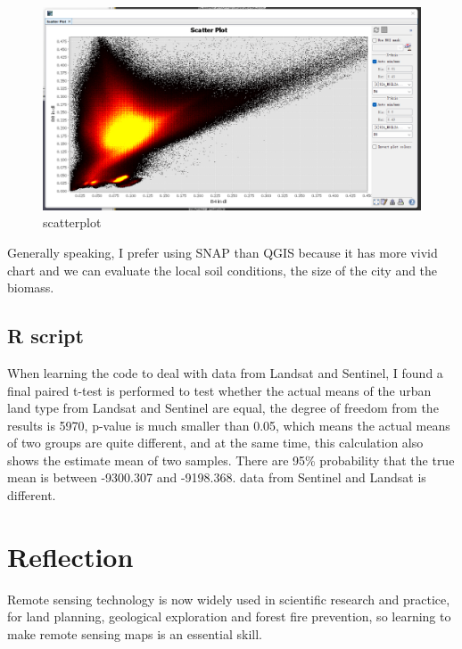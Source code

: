 \documentclass[
  letterpaper,
  DIV=11,
  numbers=noendperiod]{scrreprt}
\begin{document}
\begin{figure}

{\centering \includegraphics[width=6.25in,height=\textheight]{./image/scatterplot2.png}

}

\caption{scatterplot}

\end{figure}

Generally speaking, I prefer using SNAP than QGIS because it has more
vivid chart and we can evaluate the local soil conditions, the size of
the city and the biomass.

\hypertarget{r-script}{%
\subsection{R script}\label{r-script}}

When learning the code to deal with data from Landsat and Sentinel, I
found a final paired t-test is performed to test whether the actual
means of the urban land type from Landsat and Sentinel are equal, the
degree of freedom from the results is 5970, p-value is much smaller than
0.05, which means the actual means of two groups are quite different,
and at the same time, this calculation also shows the estimate mean of
two samples. There are 95\% probability that the true mean is between
-9300.307 and -9198.368. data from Sentinel and Landsat is different.

\hypertarget{reflection}{%
\section{Reflection}\label{reflection}}

Remote sensing technology is now widely used in scientific research and
practice, for land planning, geological exploration and forest fire
prevention, so learning to make remote sensing maps is an essential
skill.
\end{document}
